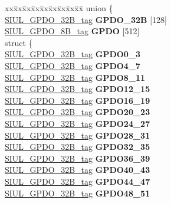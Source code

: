 \begin{DoxyCompactItemize}
\begin{tabbing}
\end{tabbing}\item 
\mbox{\label{structSIU__tag_ab752d45d4ea4bf091b2ad71b0f4cf7cc}} 
\begin{tabbing}
xx\=xx\=xx\=xx\=xx\=xx\=xx\=xx\=xx\=\kill
union \{\\
\>\mbox{\hyperlink{unionSIUL__GPDO__32B__tag}{SIUL\_GPDO\_32B\_tag}} {\bfseries GPDO\_32B} \mbox{[}128\mbox{]}\\
\>\mbox{\hyperlink{unionSIUL__GPDO__8B__tag}{SIUL\_GPDO\_8B\_tag}} {\bfseries GPDO} \mbox{[}512\mbox{]}\\
\mbox{\label{unionSIU__tag_1_1_0D1542_aa931a036dd04035a6faaf8228a221b63}} 
\>struct \{\\
\>\>\mbox{\hyperlink{unionSIUL__GPDO__32B__tag}{SIUL\_GPDO\_32B\_tag}} {\bfseries GPDO0\_3}\\
\>\>\mbox{\hyperlink{unionSIUL__GPDO__32B__tag}{SIUL\_GPDO\_32B\_tag}} {\bfseries GPDO4\_7}\\
\>\>\mbox{\hyperlink{unionSIUL__GPDO__32B__tag}{SIUL\_GPDO\_32B\_tag}} {\bfseries GPDO8\_11}\\
\>\>\mbox{\hyperlink{unionSIUL__GPDO__32B__tag}{SIUL\_GPDO\_32B\_tag}} {\bfseries GPDO12\_15}\\
\>\>\mbox{\hyperlink{unionSIUL__GPDO__32B__tag}{SIUL\_GPDO\_32B\_tag}} {\bfseries GPDO16\_19}\\
\>\>\mbox{\hyperlink{unionSIUL__GPDO__32B__tag}{SIUL\_GPDO\_32B\_tag}} {\bfseries GPDO20\_23}\\
\>\>\mbox{\hyperlink{unionSIUL__GPDO__32B__tag}{SIUL\_GPDO\_32B\_tag}} {\bfseries GPDO24\_27}\\
\>\>\mbox{\hyperlink{unionSIUL__GPDO__32B__tag}{SIUL\_GPDO\_32B\_tag}} {\bfseries GPDO28\_31}\\
\>\>\mbox{\hyperlink{unionSIUL__GPDO__32B__tag}{SIUL\_GPDO\_32B\_tag}} {\bfseries GPDO32\_35}\\
\>\>\mbox{\hyperlink{unionSIUL__GPDO__32B__tag}{SIUL\_GPDO\_32B\_tag}} {\bfseries GPDO36\_39}\\
\>\>\mbox{\hyperlink{unionSIUL__GPDO__32B__tag}{SIUL\_GPDO\_32B\_tag}} {\bfseries GPDO40\_43}\\
\>\>\mbox{\hyperlink{unionSIUL__GPDO__32B__tag}{SIUL\_GPDO\_32B\_tag}} {\bfseries GPDO44\_47}\\
\>\>\mbox{\hyperlink{unionSIUL__GPDO__32B__tag}{SIUL\_GPDO\_32B\_tag}} {\bfseries GPDO48\_51}\\

\end{tabbing}
\end{DoxyCompactItemize}
